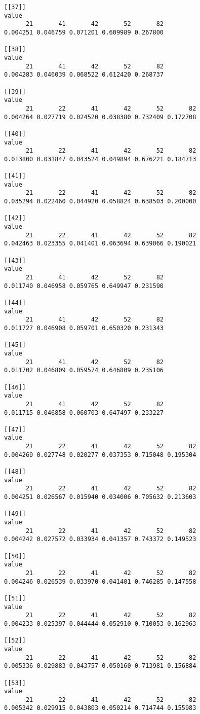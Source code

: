 \documentclass[
  letterpaper,
]{book}
\begin{document}
\begin{verbatim}
[[37]]
value
      21       41       42       52       82 
0.004251 0.046759 0.071201 0.609989 0.267800 

[[38]]
value
      21       41       42       52       82 
0.004283 0.046039 0.068522 0.612420 0.268737 

[[39]]
value
      21       22       41       42       52       82 
0.004264 0.027719 0.024520 0.038380 0.732409 0.172708 

[[40]]
value
      21       22       41       42       52       82 
0.013800 0.031847 0.043524 0.049894 0.676221 0.184713 

[[41]]
value
      21       22       41       42       52       82 
0.035294 0.022460 0.044920 0.058824 0.638503 0.200000 

[[42]]
value
      21       22       41       42       52       82 
0.042463 0.023355 0.041401 0.063694 0.639066 0.190021 

[[43]]
value
      21       41       42       52       82 
0.011740 0.046958 0.059765 0.649947 0.231590 

[[44]]
value
      21       41       42       52       82 
0.011727 0.046908 0.059701 0.650320 0.231343 

[[45]]
value
      21       41       42       52       82 
0.011702 0.046809 0.059574 0.646809 0.235106 

[[46]]
value
      21       41       42       52       82 
0.011715 0.046858 0.060703 0.647497 0.233227 

[[47]]
value
      21       22       41       42       52       82 
0.004269 0.027748 0.020277 0.037353 0.715048 0.195304 

[[48]]
value
      21       22       41       42       52       82 
0.004251 0.026567 0.015940 0.034006 0.705632 0.213603 

[[49]]
value
      21       22       41       42       52       82 
0.004242 0.027572 0.033934 0.041357 0.743372 0.149523 

[[50]]
value
      21       22       41       42       52       82 
0.004246 0.026539 0.033970 0.041401 0.746285 0.147558 

[[51]]
value
      21       22       41       42       52       82 
0.004233 0.025397 0.044444 0.052910 0.710053 0.162963 

[[52]]
value
      21       22       41       42       52       82 
0.005336 0.029883 0.043757 0.050160 0.713981 0.156884 

[[53]]
value
      21       22       41       42       52       82 
0.005342 0.029915 0.043803 0.050214 0.714744 0.155983 


\end{verbatim}
\end{document}
